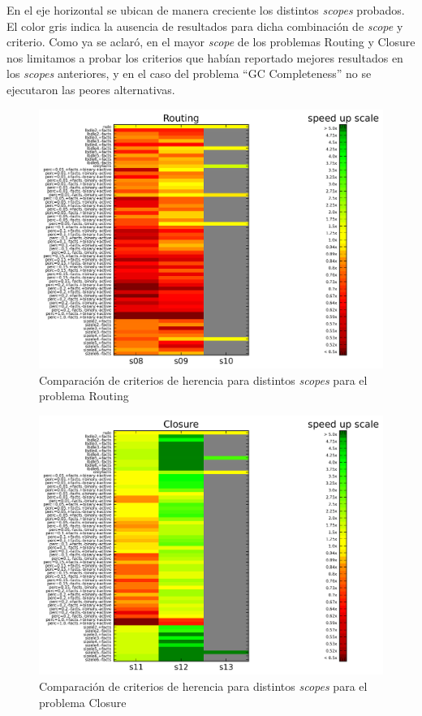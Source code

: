 En el eje horizontal se ubican de manera creciente los distintos \emph{scopes}
probados. El color gris indica la ausencia de resultados para dicha
combinación de \emph{scope} y criterio. Como ya se aclaró, en el mayor
\emph{scope} de los problemas Routing y Closure nos limitamos a probar los
criterios que habían reportado mejores resultados en los \emph{scopes}
anteriores, y en el caso del problema ``GC Completeness'' no se ejecutaron las
peores alternativas.

\begin{figure}
	\includegraphics[width=\textwidth]{resultados/losp_heat.png}
	\caption{Comparación de criterios de herencia para distintos \emph{scopes} para el problema Routing}
	\label{res:learnscopespamela}
\end{figure}

\begin{figure}
	\includegraphics[width=\textwidth]{resultados/losk_heat.png}
	\caption{Comparación de criterios de herencia para distintos \emph{scopes} para el problema Closure}
	\label{res:learnscopesclosure}
\end{figure}

